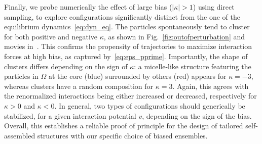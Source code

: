 \documentclass[superscriptaddress, twocolumn, prx, longbibliography, nofootinbib]{revtex4-1}
\begin{document}
Finally, we probe numerically the effect of large bias ($|\kappa|>1$) using direct sampling, to explore configurations significantly distinct from the one of the equilibrium dynamics~\eqref{eq:dyn_eq}. The particles spontaneously tend to cluster for both positive and negative $\kappa$, as shown in Fig.~\ref{fig:outofperturbation} and movies in~\cite{movie}. This confirms the propensity of trajectories to maximize interaction forces at high bias, as captured by~\eqref{eq:eps_pprime}. Importantly, the shape of clusters differs depending on the sign of $\kappa$: a micelle-like structure featuring the particles in $\Omega$ at the core (blue) surrounded by others (red) appears for $\kappa=-3$, whereas clusters have a random composition for $\kappa=3$. Again, this agrees with the renormalized interactions being either increased or decreased, respectively for $\kappa>0$ and $\kappa<0$. In general, two types of configurations should generically be stabilized, for a given interaction potential $v$, depending on the sign of the bias. Overall, this establishes a reliable proof of principle for the design of tailored self-assembled structures with our specific choice of biased ensembles.


\end{document}
